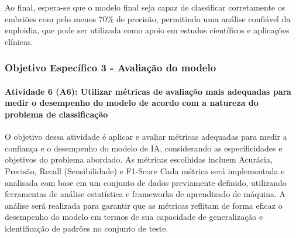 Ao final, espera-se que o modelo final seja capaz de classificar corretamente os embriões com pelo menos 70\% de precisão, permitindo uma análise confiável da euploidia, que pode ser utilizada como apoio em estudos científicos e aplicações clínicas.

\subsubsection{\textbf{Objetivo Específico 3} - Avaliação do modelo}

\paragraph{\textbf{Atividade 6 (A6):} Utilizar métricas de avaliação mais adequadas para medir o desempenho do modelo de acordo com a natureza do problema de classificação}

O objetivo dessa atividade é aplicar e avaliar métricas adequadas para medir a confiança e o desempenho do modelo de IA, considerando as especificidades e objetivos do problema abordado. As métricas escolhidas incluem Acurácia, Precisão, Recall (Sensibilidade) e F1-Score Cada métrica será implementada e analisada com base em um conjunto de dados previamente definido, utilizando ferramentas de análise estatística e frameworks de aprendizado de máquina. A análise será realizada para garantir que as métricas reflitam de forma eficaz o desempenho do modelo em termos de sua capacidade de generalização e identificação de padrões no conjunto de teste.

